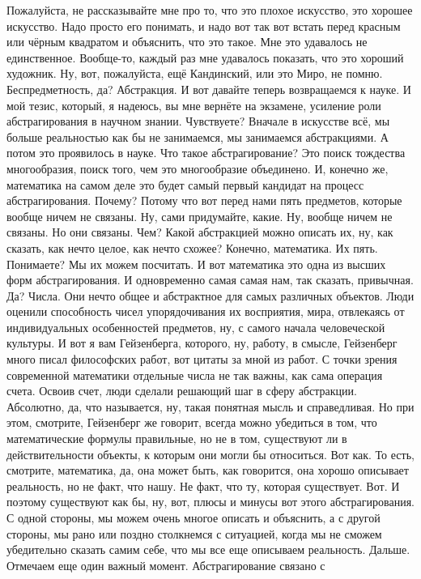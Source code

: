 Пожалуйста, не рассказывайте мне про то, что это плохое искусство, это хорошее
искусство. Надо просто его понимать, и надо вот так вот встать перед красным или
чёрным квадратом и объяснить, что это такое. Мне это удавалось не единственное.
Вообще-то, каждый раз мне удавалось показать, что это хороший художник. Ну, вот,
пожалуйста, ещё Кандинский, или это Миро, не помню. Беспредметность, да?
Абстракция. И вот давайте теперь возвращаемся к науке. И мой тезис, который, я
надеюсь, вы мне вернёте на экзамене, усиление роли абстрагирования в научном
знании. Чувствуете? Вначале в искусстве всё, мы больше реальностью как бы не
занимаемся, мы занимаемся абстракциями. А потом это проявилось в науке. Что
такое абстрагирование? Это поиск тождества многообразия, поиск того, чем это
многообразие объединено. И, конечно же, математика на самом деле это будет самый
первый кандидат на процесс абстрагирования. Почему? Потому что вот перед нами
пять предметов, которые вообще ничем не связаны. Ну, сами придумайте, какие. Ну,
вообще ничем не связаны. Но они связаны. Чем? Какой абстракцией можно описать
их, ну, как сказать, как нечто целое, как нечто схожее? Конечно, математика. Их
пять. Понимаете? Мы их можем посчитать. И вот математика это одна из высших форм
абстрагирования. И одновременно самая самая нам, так сказать, привычная. Да?
Числа. Они нечто общее и абстрактное для самых различных объектов. Люди оценили
способность чисел упорядочивания их восприятия, мира, отвлекаясь от
индивидуальных особенностей предметов, ну, с самого начала человеческой
культуры. И вот я вам Гейзенберга, которого, ну, работу, в смысле, Гейзенберг
много писал философских работ, вот цитаты за мной из работ. С точки зрения
современной математики отдельные числа не так важны, как сама операция счета.
Освоив счет, люди сделали решающий шаг в сферу абстракции. Абсолютно, да, что
называется, ну, такая понятная мысль и справедливая. Но при этом, смотрите,
Гейзенберг же говорит, всегда можно убедиться в том, что математические формулы
правильные, но не в том, существуют ли в действительности объекты, к которым они
могли бы относиться. Вот как. То есть, смотрите, математика, да, она может быть,
как говорится, она хорошо описывает реальность, но не факт, что нашу. Не факт,
что ту, которая существует. Вот. И поэтому существуют как бы, ну, вот, плюсы и
минусы вот этого абстрагирования. С одной стороны, мы можем очень многое описать
и объяснить, а с другой стороны, мы рано или поздно столкнемся с ситуацией,
когда мы не сможем убедительно сказать самим себе, что мы все еще описываем
реальность. Дальше. Отмечаем еще один важный момент. Абстрагирование связано с
